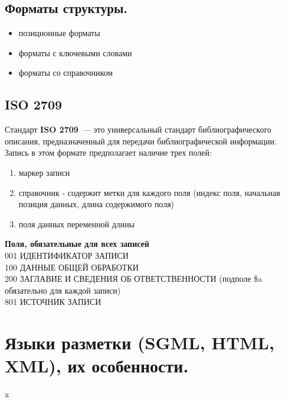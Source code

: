 \documentclass[12pt]{article}
\theoremstyle{definition}
\theoremstyle{remark}
\numberwithin{equation}{section}
\begin{document}
\subsection{Форматы структуры.}
\begin{itemize}
\item позиционные форматы
\item форматы с ключевыми словами
\item форматы со справочником
\end{itemize}

\subsection{ISO 2709}
\label{subsec:ISO}
Стандарт \textbf{ISO 2709}~--- это универсальный стандарт библиографического описания, предназначенный для передачи библиографической информации. Запись в этом формате предполагает наличие трех полей:
\begin{enumerate}
\item маркер записи
\item справочник - содержит метки для каждого поля (индекс поля, начальная позиция данных, длина содержимого поля)
\item поля данных переменной длины
\end{enumerate}

\textbf{Поля, обязательные для всех записей}
\\
001 ИДЕНТИФИКАТОР ЗАПИСИ \\
100 ДАННЫЕ ОБЩЕЙ ОБРАБОТКИ \\
200 ЗАГЛАВИЕ И СВЕДЕНИЯ ОБ ОТВЕТСТВЕННОСТИ (подполе \$a обязательно для каждой записи) \\
801 ИСТОЧНИК ЗАПИСИ \\

\section{Языки разметки (SGML, HTML, XML), их особенности.}
x
\end{document}
